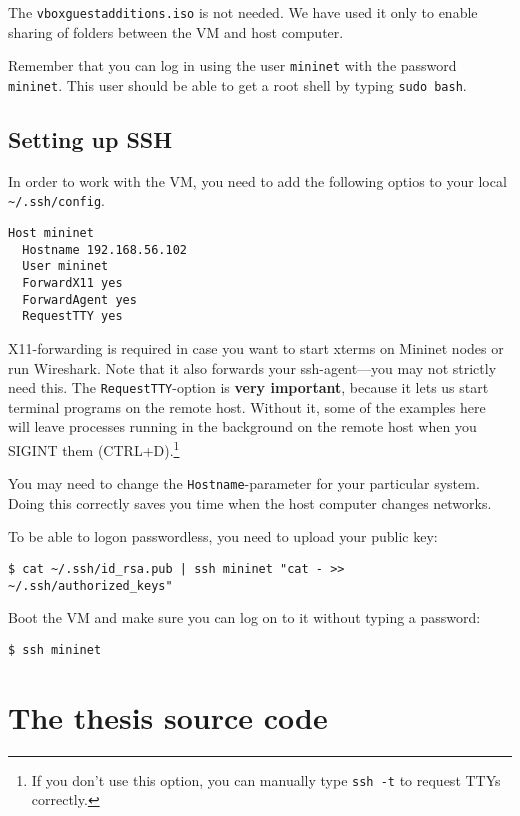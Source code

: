The \texttt{vboxguestadditions.iso} is not needed. We have used it only to
enable sharing of folders between the VM and host computer.

Remember that you can log in using the user \texttt{mininet} with the
password \texttt{mininet}.  This user should be able to get a root shell by
typing \texttt{sudo bash}.

\subsection{Setting up SSH}
\label{chapter:ssh.setup}

In order to work with the VM, you need to add the following optios to your
local \texttt{\~{}/.ssh/config}.

\begin{verbatim}
Host mininet
  Hostname 192.168.56.102
  User mininet
  ForwardX11 yes
  ForwardAgent yes
  RequestTTY yes
\end{verbatim}

X11-forwarding is required in case you want to start xterms on Mininet
nodes or run Wireshark.  Note that it also forwards your
ssh-agent---you may not strictly need this.  The \texttt{RequestTTY}-option
is \textbf{very important}, because it lets us start terminal programs on the remote
host. Without it, some of the examples here will leave processes running in
the background on the remote host when you SIGINT them (CTRL+D).\footnote{If
you don't use this option, you can manually type \texttt{ssh -t} to request
TTYs correctly.}

You may need to change the \texttt{Hostname}-parameter for your particular
system.  Doing this correctly saves you time when the host computer changes
networks.

To be able to logon passwordless, you need to upload your public key:

\begin{verbatim}
$ cat ~/.ssh/id_rsa.pub | ssh mininet "cat - >> ~/.ssh/authorized_keys"
\end{verbatim}

Boot the VM and make sure you can log on to it without typing a password:

\begin{verbatim}
$ ssh mininet
\end{verbatim}

\section{The thesis source code}

